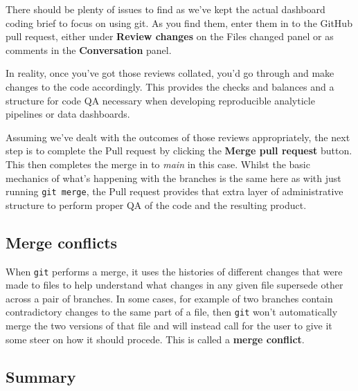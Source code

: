 \documentclass[
  12pt,
]{article}
\begin{document}
There should be plenty of issues to find as we've kept the actual
dashboard coding brief to focus on using git. As you find them, enter
them in to the GitHub pull request, either under \textbf{Review changes}
on the Files changed panel or as comments in the \textbf{Conversation}
panel.

In reality, once you've got those reviews collated, you'd go through and
make changes to the code accordingly. This provides the checks and
balances and a structure for code QA necessary when developing
reproducible analyticle pipelines or data dashboards.

Assuming we've dealt with the outcomes of those reviews appropriately,
the next step is to complete the Pull request by clicking the
\textbf{Merge pull request} button. This then completes the merge in to
\emph{main} in this case. Whilst the basic mechanics of what's happening
with the branches is the same here as with just running
\texttt{git\ merge}, the Pull request provides that extra layer of
administrative structure to perform proper QA of the code and the
resulting product.

\hypertarget{merge-conflicts}{%
\subsection{Merge conflicts}\label{merge-conflicts}}

When \texttt{git} performs a merge, it uses the histories of different
changes that were made to files to help understand what changes in any
given file supersede other across a pair of branches. In some cases, for
example of two branches contain contradictory changes to the same part
of a file, then \texttt{git} won't automatically merge the two versions
of that file and will instead call for the user to give it some steer on
how it should procede. This is called a \textbf{merge conflict}.

\hypertarget{summary-1}{%
\subsection{Summary}\label{summary-1}}
\end{document}
